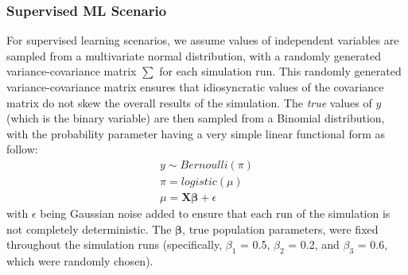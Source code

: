 \documentclass[man, 12pt, a4paper, nolmodern, noextraspace]{apa6}
\begin{document}
    \subsubsection{Supervised ML Scenario}
    For supervised learning scenarios, we assume values of independent variables are sampled from a multivariate normal distribution, with a randomly generated variance-covariance matrix \textbf{$\sum$} for each simulation run. This randomly generated variance-covariance matrix ensures that idiosyncratic values of the covariance matrix do not skew the overall results of the simulation. The \textit{true}  values of $y$ (which is the binary variable) are then sampled from a Binomial distribution, with the probability parameter having a very simple linear functional form as follow:
    \setlength{\abovedisplayskip}{2pt}
    \setlength{\belowdisplayskip}{6pt}
    \begin{equation}
        \begin{gathered}
            y \sim Bernoulli(\pi) \\
            \pi = logistic(\mu) \\
            \mu = \boldsymbol{X\beta} + \epsilon
        \end{gathered}
    \end{equation}
    \noindent with $\epsilon$ being Gaussian noise added to ensure that each run of the simulation is not completely deterministic. The $\boldsymbol{\beta}$, true population parameters, were fixed throughout the simulation runs (specifically, $\beta_1$ = 0.5, $\beta_2$ = 0.2, and $\beta_3$ = 0.6, which were randomly chosen). 
    
\end{document}
